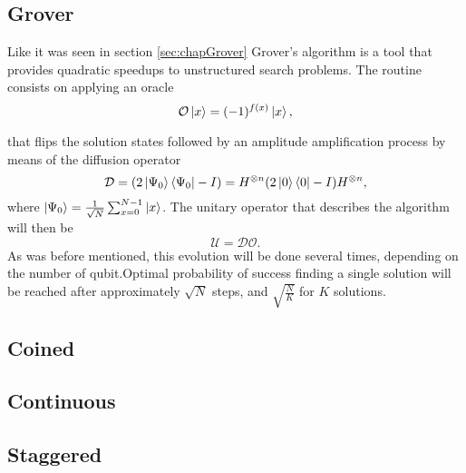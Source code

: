 \documentclass[../../dissertation.tex]{subfiles}
\begin{document}
\subsection{Grover}
Like it was seen in section \ref{sec:chapGrover} Grover's algorithm is a tool that provides quadratic speedups to unstructured search problems. The routine consists on applying an oracle
\begin{equation}
        \mathcal{O}\ket{x} = (-1)^{f(x)}\ket{x},
\end{equation}\par
that flips the solution states followed by an amplitude amplification process by means of the diffusion operator 
\begin{equation}
        \mathcal{D} = (2\ket{\Psi_0}\bra{\Psi_0} - I) = H^{\otimes n}(2\ket{0}\bra{0} - I)H^{\otimes n},
\end{equation}
where $\ket{\Psi_0}  = \frac{1}{\sqrt{N}}\sum_{x=0}^{N-1} \ket{x}$. The unitary operator that describes the algorithm will then be
\begin{equation}
        \mathcal{U} = \mathcal{D}\mathcal{O}.
\end{equation}
As was before mentioned, this evolution will be done several times, depending on the number of qubit.Optimal probability of success finding a single solution will be reached after approximately $\sqrt{N}$ steps, and $\sqrt{\frac{N}{K}}$ for $K$ solutions.

%
\subsection{Coined}
%

\subsection{Continuous}
\subsection{Staggered}
\end{document}
